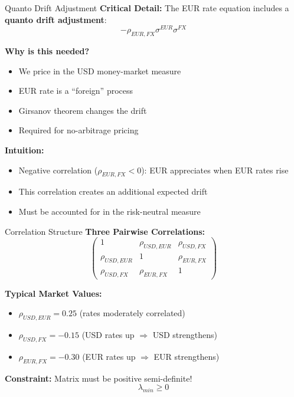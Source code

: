 \documentclass[aspectratio=169,11pt]{beamer}
\begin{document}
\begin{frame}{Quanto Drift Adjustment}
\textbf{Critical Detail:} The EUR rate equation includes a \textbf{quanto drift adjustment}:
\[
-\rho_{EUR,FX}\sigma^{EUR}\sigma^{FX}
\]

\textbf{Why is this needed?}
\begin{itemize}
    \item We price in the USD money-market measure
    \item EUR rate is a ``foreign'' process
    \item Girsanov theorem changes the drift
    \item Required for no-arbitrage pricing
\end{itemize}

\textbf{Intuition:}
\begin{itemize}
    \item Negative correlation ($\rho_{EUR,FX} < 0$): EUR appreciates when EUR rates rise
    \item This correlation creates an additional expected drift
    \item Must be accounted for in the risk-neutral measure
\end{itemize}
\end{frame}

\begin{frame}{Correlation Structure}
\textbf{Three Pairwise Correlations:}
\[
\begin{pmatrix}
1 & \rho_{USD,EUR} & \rho_{USD,FX} \\
\rho_{USD,EUR} & 1 & \rho_{EUR,FX} \\
\rho_{USD,FX} & \rho_{EUR,FX} & 1
\end{pmatrix}
\]

\textbf{Typical Market Values:}
\begin{itemize}
    \item $\rho_{USD,EUR} = 0.25$ (rates moderately correlated)
    \item $\rho_{USD,FX} = -0.15$ (USD rates up $\Rightarrow$ USD strengthens)
    \item $\rho_{EUR,FX} = -0.30$ (EUR rates up $\Rightarrow$ EUR strengthens)
\end{itemize}

\textbf{Constraint:} Matrix must be positive semi-definite!
\[
\lambda_{min} \geq 0
\]
\end{frame}
\end{document}
